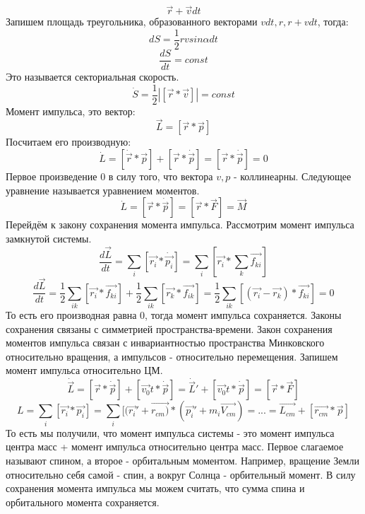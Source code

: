 \[\Vec{r} + \Vec{v}dt\]
Запишем площадь треугольника, образованного векторами $vdt, r, r + vdt$, тогда:
\[dS = \frac{1}{2}rvsin\alpha dt\]
\[\frac{dS}{dt} = const\]
Это называется секториальная скорость.
\[\dot S = \frac{1}{2}|[\Vec{r} * \Vec{v}]| = const\]
Момент импульса, это вектор:
\[\Vec{L} = [\Vec{r} * \Vec{p}]\]
Посчитаем его производную:
\[\dot L = [\dot \Vec{r} * \Vec{p}] + [\Vec{r} * \dot \Vec{p}] = [\Vec{r} * \dot \Vec{p}] = 0\]
Первое произведение 0 в силу того, что вектора $v, p$ - коллинеарны.
Следующее уравнение называется уравнением моментов.
\[\dot L = [\Vec{r} * \dot \Vec{p}] = [\Vec{r} * \Vec{F}] = \Vec{M}\]
Перейдём к закону сохранения момента импульса.
\newline Рассмотрим момент импульса замкнутой системы.
\[\frac{d\Vec{L}}{dt} = \sum_i [\Vec{r_i} * \dot \Vec{p_i}] = \sum_i [\Vec{r_i} * \sum_k \Vec{f_{ki}}]\]
\[\frac{d\Vec{L}}{dt} = \frac{1}{2}\sum_{ik}[\Vec{r_i} * \Vec{f_{ki}}] + \frac{1}{2}\sum_{ik}[\Vec{r_k} * \Vec{f_{ik}}] = \frac{1}{2}\sum_{ik} [(\Vec{r_i} - \Vec{r_k}) * \Vec{f_{ki}}] = 0\]
\newline То есть его производная равна 0, тогда момент импульса сохраняется.
\newline Законы сохранения связаны с симметрией пространства-времени.
\newline Закон сохранения моментов импульса связан с инвариантностью пространства Минковского относительно вращения, а импульсов - относительно перемещения.
\newline Запишем момент импульса относительно ЦМ.
\[\dot \Vec{L} = [\Vec{r} * \dot \Vec{p}] + [\Vec{v_0}t * \dot \Vec{p}] = \dot \Vec{L}'  + [\Vec{v_0}t * \dot \Vec{p}] = [\Vec{r} * \Vec{F}]\]
\[L = \sum_i [\Vec{r_i} * \Vec{p_i}] = \sum_i [(\Vec{r_i}' + \Vec{r_{cm})} * (\Vec{p_i}' + m_i\Vec{V_{cm}}) = ... = \Vec{L_{cm}} + [\Vec{r_{cm}} * \Vec{p}]\]
То есть мы получили, что момент импульса системы - это момент импульса центра масс + момент импульса относительно центра масс.
Первое слагаемое называют спином, а второе - орбитальным моментом.
Например, вращение Земли относительно себя самой - спин, а вокруг Солнца - орбительный момент.
В силу сохранения момента импульса мы можем считать, что сумма спина и орбитального момента сохраняется.